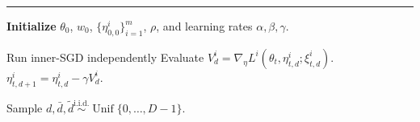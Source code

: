 \documentclass[twoside]{article} %
\theoremstyle{plain}
\theoremstyle{definition}
\theoremstyle{remark}
\newcommand{\fL}{\mathcal{L}}
\begin{document}
\begin{algorithm}[t]
\hrule
\vspace{0.3em}

\caption{Double-loop MGDA for DR-MOO}
\label{alg1}

\vspace{-0.5em}
\vspace{0.3em}

\footnotesize
\begin{algorithmic}[1]
\STATE \textbf{Initialize} $\theta_0$, $w_0$,
$\{\eta^i_{0,0}\}_{i=1}^m$, $\rho$, and learning rates
$\alpha,\beta,\gamma$.

    \STATE Run inner-SGD independently
        \STATE Evaluate
        $V^i_d=\nabla_{\eta}L^i(
        \theta_t,\eta^i_{t,d};\xi^i_{t,d})$.
        \STATE
        $\eta^i_{t,d+1}=\eta^i_{t,d}-\gamma V^i_d$.
    \ENDFOR

    \STATE Sample $d,\bar d,\tilde d
\overset{\mathrm{i.i.d.}}{\sim}\operatorname{Unif}\{0,\ldots,D-1\}$.


\end{algorithmic}
\end{algorithm}
\end{document}
